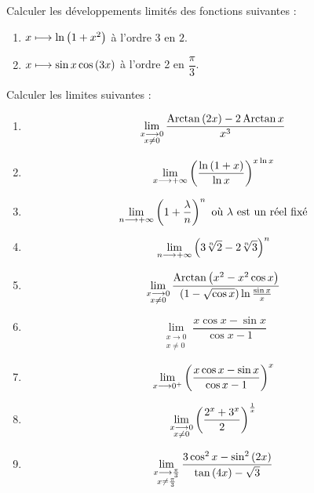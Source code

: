 \begin{corr}
\end{corr}

\begin{exo}[Exercice 7]
Calculer les développements limités des fonctions suivantes :

\begin{enumerate}
\item \(x\longmapsto\ln\left(1+x^2\right)\) à l'ordre 3 en \(2\). \\

\item \(x\longmapsto\sin x\cos\left(3x\right)\) à l'ordre 2 en \(\dfrac{\pi}{3}\).
\end{enumerate}
\end{exo}

\begin{corr}
\end{corr}

\begin{exo}[Exercice 8]
Calculer les limites suivantes :

\begin{enumerate}
\item \[\lim_{\substack{x\longrightarrow0 \\ x\not=0}}\dfrac{\operatorname{Arctan}\left(2x\right)-2\operatorname{Arctan} x}{x^3}\]

\item \[\lim_{x\longrightarrow+\infty}\left(\dfrac{\ln\left(1+x\right)}{\ln x}\right)^{x\ln x}\]

\item \[\lim_{n\longrightarrow+\infty}\left(1+\dfrac{\lambda}{n}\right)^n\text{ où \(\lambda\) est un réel fixé}\]

\item \[\lim_{n\longrightarrow+\infty}\left(3\sqrt[n]{2}-2\sqrt[n]{3}\right)^n\]

\item \[\lim_{\substack{x\longrightarrow0 \\ x\not=0}}\dfrac{\operatorname{Arctan}\left(x^2-x^2\cos x\right)}{\left(1-\sqrt{\cos x}\right)\ln\frac{\sin x}{x}}\]

\item \[\lim_{\substack{x\to0 \\ x\not=0}}\dfrac{x\cos x-\sin x}{\cos x-1}\]

\item \[\lim_{x\longrightarrow0^+}\left(\dfrac{x\cos x-\sin x}{\cos x-1}\right)^x\]

\item \[\lim_{\substack{x\longrightarrow0 \\ x\not=0}}\left(\dfrac{2^x+3^x}{2}\right)^{\frac{1}{x}}\]

\item \[\lim_{\substack{x\longrightarrow\frac{\pi}{3} \\ x\not=\frac{\pi}{3}}}\dfrac{3\cos^2x-\sin^2\left(2x\right)}{\tan\left(4x\right)-\sqrt{3}}\]
\end{enumerate}
\end{exo}


